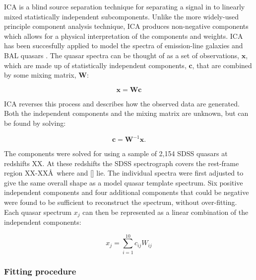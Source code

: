 \ac{ICA} is a blind source separation technique for separating a signal in to linearly mixed statistically independent subcomponents. 
Unlike the more widely-used principle component analysis technique, \ac{ICA} produces non-negative components which allows for a physical interpretation of the components and weights.  
\ac{ICA} has been succesfully applied to model the spectra of emission-line galaxies \citep{allen13} and BAL quasars \citep{allen11}. 
The quasar spectra can be thought of as a set of observations, $\bm{x}$, which are made up of statistically independent components, $\bm{c}$, that are combined by some mixing matrix, $\bm{W}$:

\begin{equation}
    \bm{x} = \bm{W}\bm{c}
\end{equation}

\ac{ICA} reverses this process and describes how the observed data are generated. 
Both the independent components and the mixing matrix are unknown, but can be found by solving:

\begin{equation}
    \bm{c} = \bm{W}^{-1}\bm{x}.
\end{equation}

The components were solved for using a sample of 2,154 \ac{SDSS} quasars at redshifts XX. 
At these redshifts the \ac{SDSS} spectrograph covers the rest-frame region XX-XX\AA\, where \hb and [] lie. 
The individual spectra were first adjusted to give the same overall shape as a model quasar template spectrum.
Six positive independent components and four additional components that could be negative were found to be sufficient to reconstruct the spectrum, without over-fitting. 
Each quasar spectrum $x_j$ can then be represented as a linear combination of the independent components: 

\begin{equation}
    x_j = \sum_{i=1}^{10} c_{ij}W_{ij}
\end{equation}

\subsubsection{Fitting procedure}

